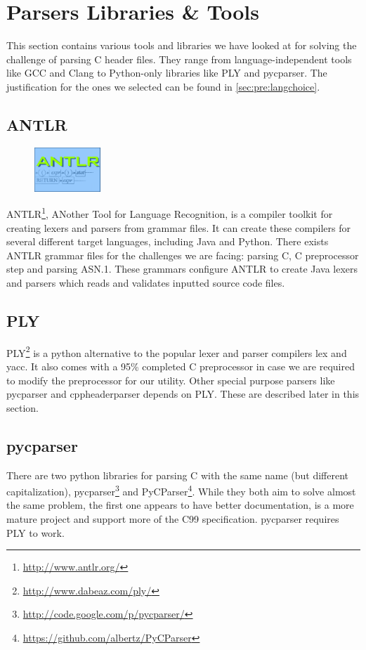\section{Parsers Libraries \& Tools}
\label{sec:pre:parsers}
This section contains various tools and libraries we have looked at for solving
the challenge of parsing C header files. They range from language-independent
tools like GCC and Clang to Python-only libraries like PLY and pycparser. The
justification for the ones we selected can be found in
\autoref{sec:pre:langchoice}.

\subsection{ANTLR}
\label{sec:pre:antlr}
\begin{figure}
	\vspace{-20pt}
	\includegraphics[width=2.5cm]{./planning/img/antlr_logo}
	\vspace{-20pt}
\end{figure}
ANTLR\footnote{\url{http://www.antlr.org/}}, ANother Tool for Language
Recognition, is a compiler toolkit for creating lexers and parsers from grammar
files. It can create these compilers for several different target languages,
including Java and Python. There exists ANTLR grammar files for the challenges
we are facing: parsing C, C preprocessor step and parsing ASN.1. These grammars
configure ANTLR to create Java lexers and parsers which reads and validates
inputted source code files.

\subsection{PLY}
PLY\footnote{\url{http://www.dabeaz.com/ply/}} is a python alternative to the
popular lexer and parser compilers lex and yacc. It also comes with a 95\%
completed C preprocessor in case we are required to modify the preprocessor
for our utility. Other special purpose parsers like pycparser and
cppheaderparser depends on PLY. These are described later in this section.

\subsection{pycparser}
There are two python libraries for parsing C with the same name (but different
capitalization), pycparser\footnote{\url{http://code.google.com/p/pycparser/}}
and PyCParser\footnote{\url{https://github.com/albertz/PyCParser}}. While they
both aim to solve almost the same problem, the first one appears to have better
documentation, is a more mature project and support more of the C99
specification. pycparser requires PLY to work.

